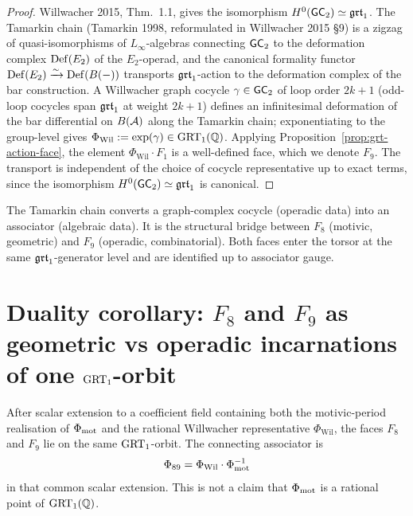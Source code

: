 \begin{proof}
Willwacher 2015, Thm.~1.1, gives the isomorphism
$H^0(\mathsf{GC}_2)\simeq\mathfrak{grt}_1$. The Tamarkin chain (Tamarkin 1998,
reformulated in Willwacher 2015 \S9) is a zigzag of
quasi-isomorphisms of $L_\infty$-algebras connecting $\mathsf{GC}_2$
to the deformation complex $\mathrm{Def}(E_2)$ of the $E_2$-operad, and
the canonical formality functor
$\mathrm{Def}(E_2)\xrightarrow{\sim}\mathrm{Def}(B(-))$ transports $\mathfrak{grt}_1$-action
to the deformation complex of the bar construction. A Willwacher
graph cocycle $\gamma\in\mathsf{GC}_2$ of loop order $2k+1$ (odd-loop
cocycles span $\mathfrak{grt}_1$ at weight $2k+1$) defines an infinitesimal
deformation of the bar differential on $B(\mathcal{A})$ along the
Tamarkin chain; exponentiating to the group-level gives
$\Phi_{\mathrm{Wil}} := \exp(\gamma)\in\mathrm{GRT}_1(\mathbb{Q})$. Applying
Proposition~\ref{prop:grt-action-face}, the element
$\Phi_{\mathrm{Wil}}\cdot F_1$ is a well-defined face, which we
denote $F_9$. The transport is independent of the choice of
cocycle representative up to exact terms, since the isomorphism
$H^0(\mathsf{GC}_2)\simeq\mathfrak{grt}_1$ is canonical.
\end{proof}

\begin{remark}
The Tamarkin chain converts a graph-complex cocycle (operadic
data) into an associator (algebraic data). It is the structural
bridge between $F_8$ (motivic, geometric) and $F_9$ (operadic,
combinatorial). Both faces enter the torsor at the same
$\mathfrak{grt}_1$-generator level and are identified up to associator gauge.
\end{remark}

\section{Duality corollary: $F_8$ and $F_9$ as geometric vs operadic
incarnations of one $\mathrm{GRT}_1$-orbit}
\label{sec:f8-f9-dual}

\begin{corollary}
After scalar extension to a coefficient field containing both the
motivic-period realisation of $\Phi_{\mathrm{mot}}$ and the rational
Willwacher representative $\Phi_{\mathrm{Wil}}$, the faces $F_8$ and
$F_9$ lie on the same $\mathrm{GRT}_1$-orbit. The connecting associator is
\[
 \Phi_{89} = \Phi_{\mathrm{Wil}}\cdot\Phi_{\mathrm{mot}}^{-1}
\]
in that common scalar extension. This is not a claim that
$\Phi_{\mathrm{mot}}$ is a rational point of $\mathrm{GRT}_1(\mathbb Q)$.
\end{corollary}

